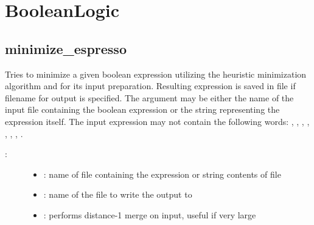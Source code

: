 \documentclass[letterpaper,10pt,english]{sphinxmanual}
\begin{document}
\section{BooleanLogic}
\label{\detokenize{BooleanLogic:booleanlogic}}\label{\detokenize{BooleanLogic::doc}}\label{\detokenize{BooleanLogic:id1}}

\subsection{minimize\_espresso}
\label{\detokenize{BooleanLogic:minimize-espresso}}\label{\detokenize{BooleanLogic:id2}}

\begin{fulllineitems}
\label{\detokenize{BooleanLogic:PyBoolNet.BooleanLogic.minimize_espresso}}
Tries to minimize a given boolean expression utilizing the heuristic minimization algorithm
 and  for its input preparation. Resulting expression is saved
in file if filename for output is specified. The argument  may be either the name
of the input file containing the boolean expression or the string representing the expression
itself. The input expression may not contain the following words: , , ,
, , , , .
\begin{description}
\item[{:}] \leavevmode\begin{itemize}
\item {} 
: name of file containing the expression or string contents of file

\item {} 
: name of the file to write the output to

\item {} 
: performs distance-1 merge on input, useful if very large


\end{itemize}
\end{description}
\end{fulllineitems}
\end{document}
